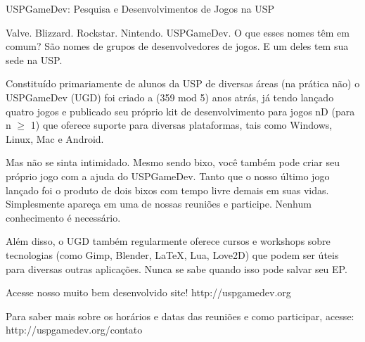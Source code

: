 \begin{secao}{USPGameDev: Pesquisa e Desenvolvimentos de Jogos na USP}

Valve. Blizzard. Rockstar. Nintendo. USPGameDev. O que esses nomes têm em comum?
São nomes de grupos de desenvolvedores de jogos. E um deles tem sua sede na USP.

Constituído primariamente de alunos da USP de diversas áreas (na prática não) o 
USPGameDev (UGD) foi criado a (359 mod 5) anos atrás, já tendo lançado quatro jogos e 
publicado seu próprio kit de desenvolvimento para jogos nD (para n $\geq$ 1) que 
oferece suporte para diversas plataformas, tais como Windows, Linux, Mac e Android. 

Mas não se sinta intimidado. Mesmo sendo bixo, você também pode criar seu
próprio jogo com a ajuda do USPGameDev. Tanto que o nosso último jogo lançado
foi o produto de dois bixos com tempo livre demais em suas vidas. Simplesmente
apareça em uma de nossas reuniões e participe. Nenhum conhecimento é necessário.

Além disso, o UGD também regularmente oferece cursos e workshops sobre tecnologias
(como Gimp, Blender, LaTeX, Lua, Love2D) que podem ser úteis para
diversas outras aplicações. Nunca se sabe quando isso pode
salvar seu EP.

Acesse nosso muito bem desenvolvido site! 
http://uspgamedev.org

Para saber mais sobre os horários e datas das reuniões e como participar, acesse:
http://uspgamedev.org/contato

\end{secao}



